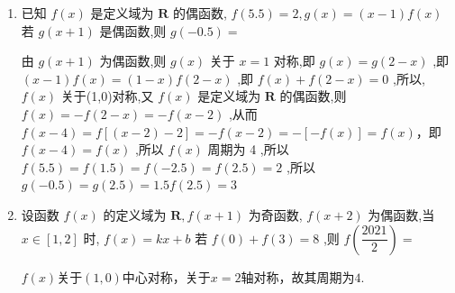 \begin{enumerate}
\begin{jieda}
        令 $y = 1$ ,则 $f\left( {x + 1}\right)  = f\left( x\right) f\left( 0\right)  + f\left( {1 - x}\right) f\left( 1\right)  = f\left( {1 - x}\right) ,\therefore f\left( x\right)$ 关于直线 $x = 1$ 对称;
        
        令 $y =  - x$ ,则 $f\left( 0\right)  = f\left( x\right) f\left( {1 + x}\right)  + f\left( {1 - x}\right) f\left( {-x}\right)  = \left\lbrack  {f\left( x\right)  + f\left( {-x}\right) }\right\rbrack  f\left( {1 + x}\right)  = 0$ ,
        
        $\because f\left( {1 + x}\right)  = 0$ 不恒成立, $\therefore f\left( x\right)  + f\left( {-x}\right)  = 0$ 恒成立, $\therefore f\left( x\right)$ 为奇函数,
        
        $\because f\left( {x + 2}\right)  = f\left( {-x}\right)  =  - f\left( x\right) ,\therefore f\left( {x + 4}\right)  =  - f\left( {x + 2}\right)  = f\left( x\right)$ ,
        
        $\therefore f\left( x\right)$ 是周期为 4 的周期函数, $\therefore f\left( {55}\right)  = f\left( {4 \times  {14} - 1}\right)  = f\left( {-1}\right)  =  - 1$ .
    \end{jieda}
    
    \item 已知 $f\left( x\right)$ 是定义域为 $\mathbf{R}$ 的偶函数, $f\left( {5.5}\right)  = 2,g\left( x\right)  = \left( {x - 1}\right) f\left( x\right)$ 若 $g\left( {x + 1}\right)$ 是偶函数,则 $g\left( {-{0.5}}\right)  =$
    \begin{jieda}
        由 $g\left( {x + 1}\right)$ 为偶函数,则 $g\left( x\right)$ 关于 $x = 1$ 对称,即 $g\left( x\right)  = g\left( {2 - x}\right)$ ,即 $\left( {x - 1}\right) f\left( x\right)  = (1 -x)f\left( {2 - x}\right)$ ,即 $f\left( x\right)  + f\left( {2 - x}\right)  = 0$ ,所以, $f\left( x\right)$ 关于(1,0)对称,又 $f\left( x\right)$ 是定义域为 $\mathbf{R}$ 的偶函数,则$f\left( x\right)  =  - f\left( {2 - x}\right)  =  - f\left( {x - 2}\right)$ ,从而 $f\left( {x - 4}\right)  = f\left\lbrack  {\left( {x - 2}\right)  - 2}\right\rbrack   =  - f\left( {x - 2}\right)  =  - \left\lbrack  {-f\left( x\right) }\right\rbrack   = f\left( x\right)$，即 $f\left( {x - 4}\right)  = f\left( x\right)$ ,所以 $f\left( x\right)$ 周期为 4 ,所以 $f\left( {5.5}\right)  = f\left( {1.5}\right)  = f\left( {-{2.5}}\right)  = f\left( {2.5}\right)  = 2$ ,所以 $g\left( {-{0.5}}\right)  = g\left( {2.5}\right)  = {1.5f}\left( {2.5}\right)  = 3$
    \end{jieda}
    
    \item 设函数 $f\left( x\right)$ 的定义域为 $\mathbf{R},f\left( {x + 1}\right)$ 为奇函数, $f\left( {x + 2}\right)$ 为偶函数,当 $x \in  \left\lbrack  {1,2}\right\rbrack$ 时, $f\left( x\right)  = {kx} + b$ 若 $f\left( 0\right)  + f\left( 3\right)  = 8$ ,则 $f\left( \dfrac{2021}{2}\right)  =$ 
    \begin{jieda}
    $f(x)$关于$(1, 0)$中心对称，关于$x = 2$轴对称，故其周期为$4$.


\end{jieda}
\end{enumerate}
